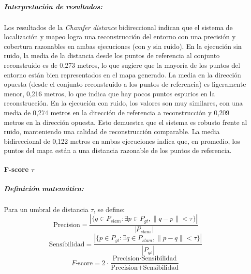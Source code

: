 \documentclass[12pt, a4paper, twoside]{article}
\begin{document}
\subparagraph{Interpretación de resultados:}
Los resultados de la \textit{Chamfer\cite{Fan2020Chamfer} distance} bidireccional indican que el sistema de localización y mapeo logra una reconstrucción del entorno con una precisión y 
cobertura razonables en ambas ejecuciones (con y sin ruido).
En la ejecución sin ruido, la media de la distancia desde los puntos de referencia al conjunto reconstruido es de 0,273 metros,
lo que sugiere que la mayoría de los puntos del entorno están bien representados en el mapa generado.
La media en la dirección opuesta (desde el conjunto reconstruido a los puntos de referencia) es ligeramente menor, 0,216 metros,
lo que indica que hay pocos puntos espurios en la reconstrucción.\newpage 
En la ejecución con ruido, los valores son muy similares, con una media de 0,274 metros en la dirección de referencia a reconstrucción y
0,209 metros en la dirección opuesta. Esto demuestra que el sistema es robusto frente al ruido, manteniendo una calidad de reconstrucción comparable.\newline
La media bidireccional de 0,122 metros en ambas ejecuciones indica que, en promedio, los puntos del mapa están a una distancia razonable de los puntos de referencia.


\paragraph{F-score\cite{Caccia2018FScore} \(\tau\)}

\subparagraph{Definición matemática:}
Para un umbral de distancia $\tau$, se define:
\[
\text{Precision} = \frac{|\{ q \in P_{slam} : \exists p \in P_{gt}, \|q-p\| < \tau \}|}{|P_{slam}|}
\]
\[
\text{Sensibilidad} = \frac{|\{ p \in P_{gt} : \exists q \in P_{slam}, \|p-q\| < \tau \}|}{|P_{gt}|}
\]
\[
F\text{-score} = 2 \cdot \frac{\text{Precision} \cdot \text{Sensibilidad}}{\text{Precision} + \text{Sensibilidad}}
\]
\end{document}
